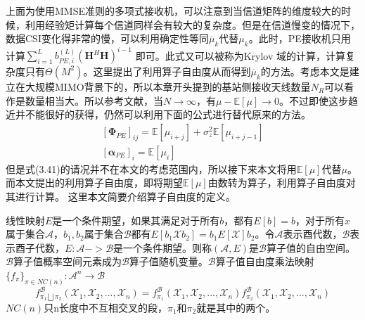 \documentclass[bachelor,nocolorlinks, printoneside]{seuthesis} %
\begin{document}
\begin{Main}
上面为使用MMSE准则的多项式接收机，可以注意到当信道矩阵的维度较大的时候，利用经验矩计算每个信道同样会有较大的复杂度。但是在信道慢变的情况下，数据CSI变化得非常的慢，可以利用确定性等同$\overline{\mu}_k$代替$\mu_k$。此时，PE接收机只用计算$\sum_{i=1}^{L} b_{PE,i}^{(L)}(\mathbf{H}^H\mathbf{H})^{i-1}$ 即可。此式又可以被称为Krylov 域的计算，计算复杂度只有$\Theta(M^2)$。这里提出了利用算子自由度从而得到$\overline{\mu}_k$的方法。考虑本文是建立在大规模MIMO背景下的，所以本章开头提到的基站侧接收天线数量$N_R$可以看作是数量相当大。所以参考文献，当$N \rightarrow \infty$，有$\mu - \mathbb{E}[\mu] \rightarrow 0$。不过即使这步趋近并不能很好的获得，仍然可以利用下面的公式进行替代原来的方法。
\begin{eqnarray}\label{key}
[\mathbf{\Phi}_{PE}]_{ij} = \mathbb{E}[\mu_{i+j}] + \sigma_{z}^2 \mathbb{E}[\mu_{i+j-1}] \nonumber \\
\left[\mathbf{\alpha}_{PE}\right]_i = \mathbb{E}[\mu_i]
\end{eqnarray}
但是式(3.41)的请况并不在本文的考虑范围内，所以接下来本文将用$\mathbb{E}[\mu]$代替$\mu$。而本文提出的利用算子自由度，即将期望$\mathbb{E}[\mu]$由数转为算子，利用算子自由度对其进行计算。
这里本文简要介绍算子自由度的定义。

线性映射$E$是一个条件期望，如果其满足对于所有$b$，都有$E[b]=b$，对于所有$x$属于集合$\mathcal{A}$，$b_1,b_2$属于集合$\mathcal{B}$都有$E[b_1\mathcal{X}b_2]= b_1E[\mathcal{X}]b_2$。令$\mathcal{A}$表示酉代数，$\mathcal{B}$表示酉子代数，$E:\mathcal{A}->\mathcal{B}$是一个条件期望。则称$(\mathcal{A},E)$是$\mathcal{B}$算子值的自由空间。$\mathcal{B}$算子值概率空间元素成为$\mathcal{B}$算子值随机变量。$\mathcal{B}$算子值自由度乘法映射$\lbrace f_{\pi} \rbrace _{\pi \in NC(n)}:\mathcal{A}^n \rightarrow \mathcal{B}$
\begin{equation}\label{key}
f_{\pi_1 \bigsqcup \pi_2}^{\mathcal{B}}(\mathcal{X}_1,\mathcal{X}_2,...,\mathcal{X}_n) = f_{\pi_1}^{\mathcal{B}}(\mathcal{X}_1,\mathcal{X}_2,...,\mathcal{X}_n)f_{\pi_2}^{\mathcal{B}}(\mathcal{X}_1,\mathcal{X}_2,...,\mathcal{X}_n)
\end{equation}
$NC(n)$只n长度中不互相交叉的段，$\pi_1$和$\pi_2$就是其中的两个。


\end{Main}
\end{document}

